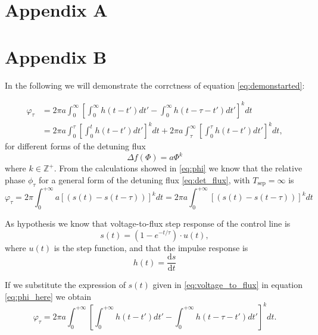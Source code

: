 \chapter*{Appendix A} 
\label{app:AppendixA}




\chapter*{Appendix B}
\label{app:AppendixB}

In the following we will demonstrate the corrctness of equation \ref{eq:demonstarted}:

\begin{align}
    \varphi_\tau &= 2\pi a \int_{0}^{\infty} \left[ \int_{0}^{\infty} h(t - t') dt' - \int_{0}^{\infty} h(t - \tau - t') dt' \right]^k dt \\
    &= 2\pi a \int_{0}^{\tau} \left[ \int_{0}^{t} h(t - t') dt' \right]^k dt + 2\pi a \int_{\tau}^{\infty} \left[ \int_{0}^{\tau} h(t - t') dt' \right]^k dt,
\end{align}
for different forms of the detuning flux 
\begin{equation}\label{eq:det_flux}
    \Delta f(\Phi) = a\Phi^k
\end{equation}
where $k \in \mathbb{Z}^+$.
From the calculations showed in \ref{eq:phi} we know that the relative phase $\phi_\tau$ for a general form of the detuning flux \ref{eq:det_flux}, with $T_{\text{sep}} = \infty$ is
\begin{equation}\label{eq:phi_here}
    \varphi_{\tau} = 2\pi \int_{0}^{+\infty} a \left[ \left( s(t) - s(t - \tau) \right) \right]^k dt = 2\pi a \int_{0}^{+\infty} \left[ \left( s(t) - s(t - \tau) \right) \right]^k dt
\end{equation}

As hypothesis we know that voltage-to-flux step response of the control line is 
\begin{equation}\label{eq:voltage_to_flux}
    s(t) = \left(1 - e^{-t/\tau} \right) \cdot u(t),
\end{equation} where $u(t)$ is the step function, and that the impulse response is 
\begin{equation}\label{eq:h_def}
    h(t) = \frac{\text{d}s}{\text{d}t}
\end{equation}


If we substitute the expression of $s(t)$ given in \ref{eq:voltage_to_flux} in equation \ref{eq:phi_here} we obtain
\begin{equation}\label{eq:first_step_dem}
    \varphi_{\tau} = 2\pi a \int_{0}^{+\infty} \left[ \int_{0}^{+\infty} h(t - t') dt' - \int_{0}^{+\infty} h(t - \tau - t') dt' \right]^k dt.
\end{equation}

